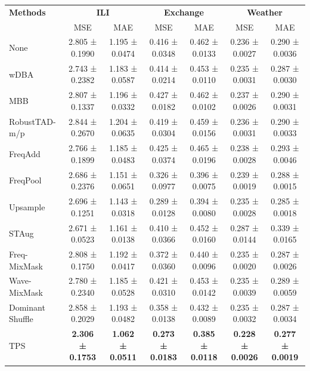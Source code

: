 \begin{table}[h!]
\centering
\vspace{0.2cm}
\renewcommand{\arraystretch}{1.2}
\begin{adjustbox}{max width=\textwidth}
\begin{tabular}{l|cc|cc|cc}
    \toprule
    \textbf{Methods} & \multicolumn{2}{c|}{\textbf{ILI}} & \multicolumn{2}{c|}{\textbf{Exchange}} & \multicolumn{2}{c}{\textbf{Weather}} \\
    & MSE & MAE & MSE & MAE & MSE & MAE \\
    \midrule
    None          & 2.805 ± 0.1990 & 1.195 ± 0.0474 & 0.416 ± 0.0348 & 0.462 ± 0.0133 & 0.236 ± 0.0027 & 0.290 ± 0.0036 \\
            wDBA           & 2.743 ± 0.2382 & 1.183 ± 0.0587 & 0.414 ± 0.0214 & 0.453 ± 0.0110 & 0.235 ± 0.0031 & 0.287 ± 0.0030 \\
        MBB           & 2.807 ± 0.1337 & 1.196 ± 0.0332 & 0.427 ± 0.0182 & 0.462 ± 0.0102 & 0.237 ± 0.0026 & 0.290 ± 0.0031 \\
        RobustTAD-m/p    & 2.844 ± 0.2670 & 1.204 ± 0.0635 & 0.419 ± 0.0304 & 0.459 ± 0.0156 & 0.236 ± 0.0031 & 0.290 ± 0.0033 \\
        FreqAdd        & 2.766 ± 0.1899 & 1.185 ± 0.0483 & 0.425 ± 0.0374 & 0.465 ± 0.0196 & 0.238 ± 0.0028 & 0.293 ± 0.0046 \\
        FreqPool       & 2.686 ± 0.2376 & 1.151 ± 0.0651 & 0.326 ± 0.0977 & 0.396 ± 0.0075 & 0.239 ± 0.0019 & 0.288 ± 0.0015 \\
        Upsample      & 2.696 ± 0.1251 & \cellcolor{secondcolor}1.143 ± 0.0318 & \cellcolor{secondcolor}0.289 ± 0.0128 & \cellcolor{secondcolor}0.394 ± 0.0080 & 0.235 ± 0.0028 & \cellcolor{secondcolor}0.285 ± 0.0018 \\
        STAug         & \cellcolor{secondcolor}2.671 ± 0.0523 & 1.161 ± 0.0138 & 0.410 ± 0.0366 & 0.452 ± 0.0160 & 0.287 ± 0.0144 & 0.339 ± 0.0165 \\
        Freq-MixMask  &  2.808 ± 0.1750 & 1.192 ± 0.0417 & 0.372 ± 0.0360 & 0.440 ± 0.0096 & \cellcolor{secondcolor}0.235 ± 0.0020 & 0.287 ± 0.0026 \\
        Wave-MixMask   & 2.780 ± 0.2340 & 1.185 ± 0.0528 & 0.421 ± 0.0310 & 0.453 ± 0.0142 & 0.235 ± 0.0039 & 0.289 ± 0.0059 \\
        Dominant Shuffle   & 2.858 ± 0.2029 & 1.193 ± 0.0482 & 0.358 ± 0.0138 & 0.432 ± 0.0089 & 0.235 ± 0.0032 & 0.287 ± 0.0034 \\
    TPS           & \cellcolor{bestcolor}\textbf{2.306 ± 0.1753} & \cellcolor{bestcolor}\textbf{1.062 ± 0.0511} & \cellcolor{bestcolor}\textbf{0.273 ± 0.0183} & \cellcolor{bestcolor}\textbf{0.385 ± 0.0118} & \cellcolor{bestcolor}\textbf{0.228 ± 0.0026} & \cellcolor{bestcolor}\textbf{0.277 ± 0.0019} \\

\end{tabular}
\end{adjustbox}
\end{table}
